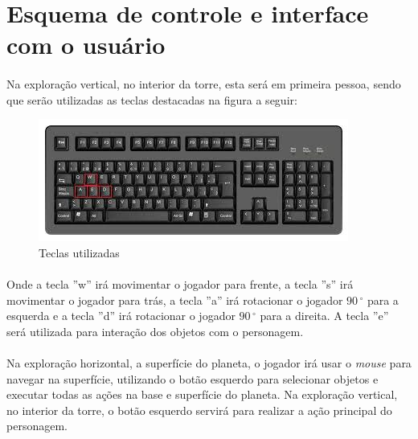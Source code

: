 \documentclass[11pt]{article} %
\begin{document}
\section{Esquema de controle e interface com o usuário}

\paragraph{}Na exploração vertical, no interior da torre, esta será em primeira pessoa, sendo que serão utilizadas as teclas destacadas na figura a seguir:\\

\begin{figure}[!htp]
\centering
\includegraphics[scale=0.75]{res/keyboard.jpg}
\caption{Teclas utilizadas}
\label{Teclado}
\end{figure}

\paragraph{}Onde a tecla ''w'' irá movimentar o jogador para frente, a tecla ''s'' irá movimentar o jogador para trás, a tecla ''a'' irá rotacionar o jogador $90\,^{\circ}$ para a esquerda e a tecla ''d'' irá rotacionar o jogador $90\,^{\circ}$ para a direita. A tecla ''e'' será utilizada para interação dos objetos com o personagem.

\paragraph{}Na exploração horizontal, a superfície do planeta, o jogador irá usar o \textit{mouse} para navegar na superfície, utilizando o botão esquerdo para selecionar objetos e executar todas as ações na base e superfície do planeta. Na exploração vertical, no interior da torre, o botão esquerdo servirá para realizar a ação principal do personagem.
\end{document}

